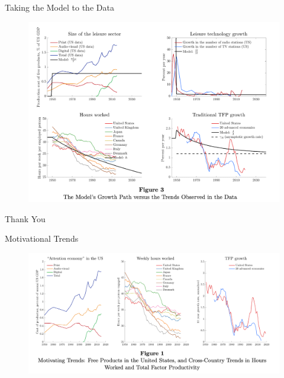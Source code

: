 \documentclass[usenames,dvipsnames]{beamer}
\begin{document}
\begin{frame}{Taking the Model to the Data}
\begin{figure}
    \centering    
    \includegraphics[width=\textwidth]{Presentation01/Figures/ModTrends.png}
\end{figure}  
\end{frame}

\begin{frame}
\begin{center}    
    \Huge{Thank You}
\end{center}
\end{frame}



\begin{frame}{Motivational Trends}\label{p1:Mot}
    \begin{figure}
    \centering    
    \includegraphics[width=\textwidth]{Presentation01/Figures/MotFacts.png}
\end{figure}
\hyperlink{p1:Int}{}

\end{frame}
\end{document}
